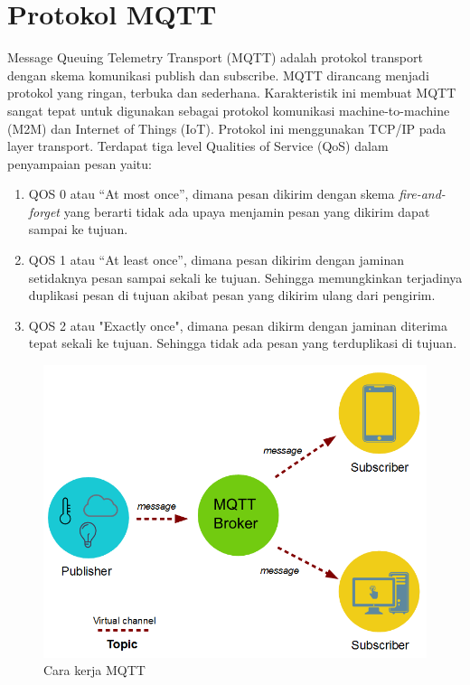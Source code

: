 \section{Protokol MQTT}
Message Queuing Telemetry Transport (MQTT) adalah protokol transport
dengan skema komunikasi publish dan subscribe. MQTT dirancang menjadi protokol yang ringan, terbuka dan sederhana. Karakteristik ini membuat MQTT sangat tepat untuk digunakan sebagai protokol komunikasi machine-to-machine (M2M) dan Internet of Things (IoT). Protokol ini menggunakan TCP/IP pada layer transport. Terdapat tiga level Qualities of Service (QoS) dalam penyampaian pesan yaitu:
\begin{enumerate}
	\item QOS 0 atau “At most once”, dimana pesan dikirim dengan skema \textit{fire-and-forget} yang berarti tidak ada upaya menjamin pesan yang dikirim dapat sampai ke tujuan.
	\item QOS 1 atau “At least once”, dimana pesan dikirim dengan jaminan setidaknya pesan sampai sekali ke tujuan. Sehingga memungkinkan terjadinya duplikasi pesan di tujuan akibat pesan yang dikirim ulang dari pengirim.
	\item QOS 2 atau "Exactly once", dimana pesan dikirm dengan jaminan diterima tepat sekali ke tujuan. Sehingga tidak ada pesan yang terduplikasi di tujuan.	
\end{enumerate}

\begin{figure}[H]
	\centering
	\includegraphics[scale=0.45]{images/mqtt.png}
	\caption{Cara kerja MQTT}
\end{figure}

